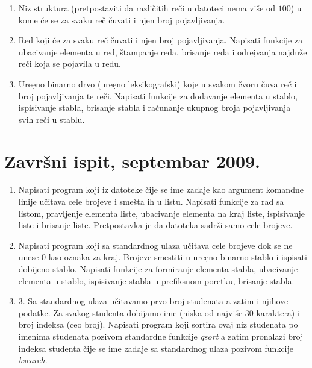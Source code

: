 \begin{enumerate}
\item Niz struktura (pretpostaviti da razli\v citih re\v ci u datoteci nema
vi\v se od $100$) u kome \' ce se za svaku re\v c \v cuvati i njen
broj pojavljivanja.

\item Red koji \' ce za svaku re\v c \v cuvati i njen broj pojavljivanja.
Napisati funkcije za ubacivanje elementa u red, \v stampanje reda,
brisanje reda i
odre\d ivanja najdu\v ze re\v ci koja se pojavila u redu.

\item Ure\d eno binarno drvo (ure\d eno leksikografski) koje u svakom
\v cvoru \v cuva re\v c i broj pojavljivanja te re\v ci. Napisati
funkcije za dodavanje elementa u stablo, ispisivanje stabla, brisanje
stabla i ra\v cunanje ukupnog
broja pojavljivanja svih re\v ci u stablu.

\end{enumerate}



\section{Zavr\v{s}ni ispit, septembar 2009.}



\begin{enumerate}
\item
Napisati program koji iz datoteke \v cije se ime zadaje kao argument
komandne linije u\v citava cele brojeve i sme\v sta ih u listu.
Napisati funkcije za rad sa listom, pravljenje elementa liste, ubacivanje
elementa na kraj liste, ispisivanje liste i brisanje liste.
Pretpostavka je da datoteka sadr\v zi samo cele brojeve.
\item
Napisati program koji sa standardnog ulaza u\v citava cele brojeve dok
se ne unese $0$ kao oznaka za kraj. Brojeve smestiti u ure\d eno
binarno stablo i ispisati dobijeno stablo. Napisati funkcije za formiranje
elementa stabla, ubacivanje elementa u stablo, ispisivanje stabla u
prefiksnom poretku, brisanje stabla.
\item
3. Sa standardnog ulaza u\v citavamo prvo broj studenata a zatim i
njihove podatke. Za svakog studenta dobijamo ime (niska od najvi\v se
30 karaktera) i broj indeksa (ceo broj). Napisati program koji
sortira ovaj niz studenata po imenima studenata pozivom standardne
funkcije \emph{qsort} a zatim pronalazi broj indeksa studenta \v cije
se ime zadaje sa standardnog ulaza pozivom funkcije \emph{bsearch}.

\end{enumerate}


